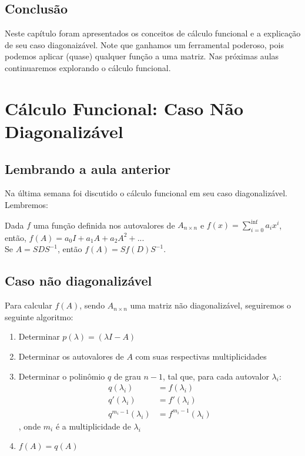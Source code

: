 \documentclass[12pt]{article}
\begin{document}
	\subsection{Conclusão}
	Neste capítulo foram apresentados os conceitos de cálculo funcional e a explicação de seu caso diagonaizável. Note que ganhamos um ferramental poderoso, pois podemos aplicar (quase) qualquer função a uma matriz. Nas próximas aulas continuaremos explorando o cálculo funcional. 
	
	\section{Cálculo Funcional: Caso Não Diagonalizável}
	
	\subsection{Lembrando a aula anterior}
	
	Na última semana foi discutido o cálculo funcional em seu caso diagonalizável. Lembremos:
	
	Dada $f$ uma função definida nos autovalores de $A_{n\times n}$	e $f(x)=\sum_{i=0}^{\inf}a_ix^i$, então, $f(A)=a_0I+a_1A+a_2A^2+...$\\
	
	Se $A=SDS^{-1}$, então $f(A)=Sf(D)S^{-1}$.
	
	\subsection{Caso não diagonalizável}
	
	Para calcular $f(A)$, sendo $A_{n\times n}$ uma matriz não diagonalizável, seguiremos o seguinte algoritmo:
	\begin{enumerate}
		\item Determinar $p(\lambda)=(\lambda I-A)$
		\item Determinar os autovalores de $A$ com suas respectivas multiplicidades
		\item Determinar o polinômio $q$ de grau $n-1$, tal que, para cada autovalor $\lambda_i$:
		\begin{align*}
			q(\lambda_i)&=f(\lambda_i)\\
			q'(\lambda_i)&=f'(\lambda_i)\\
			q^{m_i-1}(\lambda_i)&=f^{m_i-1}(\lambda_i)
		\end{align*}, onde $m_i$ é a multiplicidade de $\lambda_i$
		\item $f(A)=q(A)$
	\end{enumerate}
	
\end{document}
